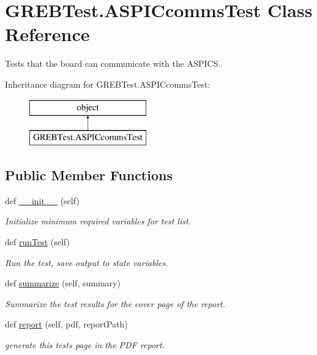 \hypertarget{class_g_r_e_b_test_1_1_a_s_p_i_ccomms_test}{}\section{G\+R\+E\+B\+Test.\+A\+S\+P\+I\+Ccomms\+Test Class Reference}
\label{class_g_r_e_b_test_1_1_a_s_p_i_ccomms_test}


Tests that the board can communicate with the A\+S\+P\+I\+CS.  


Inheritance diagram for G\+R\+E\+B\+Test.\+A\+S\+P\+I\+Ccomms\+Test\+:\begin{figure}[H]
\begin{center}
\leavevmode
\includegraphics[height=2.000000cm]{class_g_r_e_b_test_1_1_a_s_p_i_ccomms_test}
\end{center}
\end{figure}
\subsection*{Public Member Functions}
\begin{DoxyCompactItemize}
\item 
def \hyperlink{class_g_r_e_b_test_1_1_a_s_p_i_ccomms_test_aeec16202db802631206bf9a138b00bf3}{\+\_\+\+\_\+init\+\_\+\+\_\+} (self)
\begin{DoxyCompactList}\small\item\em Initialize minimum required variables for test list. \end{DoxyCompactList}\item 
def \hyperlink{class_g_r_e_b_test_1_1_a_s_p_i_ccomms_test_aad41625a1dd3747f5adce6fc0b695f1a}{run\+Test} (self)
\begin{DoxyCompactList}\small\item\em Run the test, save output to state variables. \end{DoxyCompactList}\item 
def \hyperlink{class_g_r_e_b_test_1_1_a_s_p_i_ccomms_test_adf8e1bc11cfaeec4f4c38de815260489}{summarize} (self, summary)
\begin{DoxyCompactList}\small\item\em Summarize the test results for the cover page of the report. \end{DoxyCompactList}\item 
def \hyperlink{class_g_r_e_b_test_1_1_a_s_p_i_ccomms_test_a700281a57d921609bc83feaca6f63d81}{report} (self, pdf, report\+Path)
\begin{DoxyCompactList}\small\item\em generate this test\textquotesingle{}s page in the P\+DF report. \end{DoxyCompactList}\end{DoxyCompactItemize}


